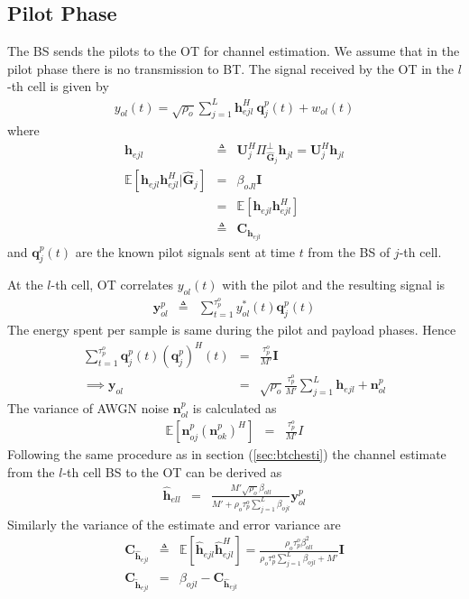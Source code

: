 \documentclass[10pt, a4paper, twoside,fleqn]{article}
\begin{document}
\subsection{Pilot Phase}
	The BS sends the pilots to the OT for channel estimation. We assume that in the pilot phase there is no transmission to BT.
The signal received by the OT in the $l$-th cell is given by
\begin{eqnarray}
	y_{ol}(t)=\sqrt{\rho_o} \sum_{j=1}^{L} \pmb{h}^H_{ejl} \ \pmb{q}^p_{j}(t) + w_{ol}(t) 
\end{eqnarray}
where
\begin{eqnarray}
	\pmb{h}_{ejl} &\triangleq& \pmb{U}_j^H\Pi^{\perp}_{{\hat{\pmb{G}}_j}}\pmb{h}_{jl} = \pmb{U}_j^H\pmb{h}_{jl} \\
    \mathbb{E}[\pmb{h}_{ejl}\pmb{h}^H_{ejl}|\pmb{\hat G}_j] &=& \beta_{oJl}\pmb{I} \nonumber \\
			                     &=& \mathbb{E}[\pmb{h}_{ejl}\pmb{h}^H_{ejl}] \nonumber \\
                                           &\triangleq& \pmb{C}_{\pmb{h}_{ejl}} \nonumber
\end{eqnarray}
and $\pmb{q}_j^p(t)$ are the known pilot signals sent at time $t$ from the BS of $j$-th cell.

At the $l$-th cell, OT correlates $y_{ol}(t)$ with the pilot and the resulting signal is
\begin{eqnarray}
	\pmb{y}_{ol}^{p} &\triangleq& \sum_{t=1}^{\tau_p^o} y_{ol}^*(t)\pmb{q}^{p}_{j}(t) \nonumber
\end{eqnarray}
The energy spent per sample is same during the pilot and payload phases. Hence 
\begin{eqnarray}
    \sum\limits_{t=1}^{\tau_p^o}\pmb{q}^p_{j}(t)(\pmb{q}^p_{j})^H(t)&=&\frac{\tau_p^o}{M'}\pmb{I} \\
\implies \pmb{y}_{ol} &=& \sqrt{\rho_o}\frac{\tau_p^o}{M'}\sum_{j=1}^{L}\pmb{h}_{ejl}+\pmb{n}^p_{ol}
\end{eqnarray}
The variance of AWGN noise $\pmb{n}_{ol}^p$ is calculated as
\begin{eqnarray}
	\mathbb{E}[\pmb{n}^p_{oj}(\pmb{n}^p_{ok})^H] &=& \frac{\tau_p^o}{M'}I \nonumber
\end{eqnarray}
Following the same procedure as in section (\ref{sec:btchesti}) the channel estimate from the $l$-th cell BS to the OT can be derived as 
\begin{eqnarray}\label{eqn:otchesti}
	\pmb{\hat h}_{ell} &=& \frac{M'\sqrt{\rho_o}\beta_{oll}}{M'+\rho_o\tau_p^o\sum\limits_{j=1}^{L}\beta_{ojl}}\pmb{y}^p_{ol}
\end{eqnarray}
Similarly the variance of the estimate and error variance are
\begin{eqnarray}
	\pmb{C}_{\pmb{\hat h}_{ejl}} &\triangleq& \mathbb{E}[\pmb{\hat h}_{ejl}\pmb{\hat h}^H_{ejl}] = \frac{\rho_o\tau_p^o\beta^2_{oll}}{\rho_o\tau_p^o\sum\limits_{j=1}^{L}\beta_{ojl}+M'}\pmb{I} \\
	\pmb{C}_{\pmb{\widetilde{h}}_{ejl}} &=& \beta_{ojl} - 	\pmb{C}_{\pmb{\hat h}_{ejl}}
\end{eqnarray}
\end{document}
